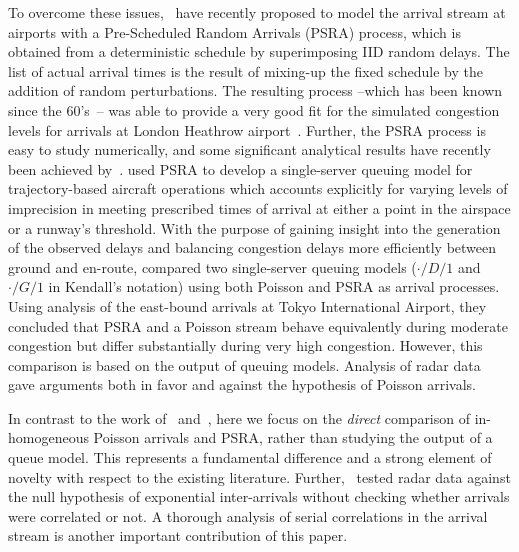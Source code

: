 \documentclass[draft,review]{elsarticle}
\begin{document}
To overcome these issues,~\citet{guadagni2011queueing} have recently proposed to model the arrival stream at airports with a Pre-Scheduled Random Arrivals (\ac{PSRA}) process, which is obtained from a deterministic schedule by superimposing \ac{IID} random delays.
The list of actual arrival times is the result of mixing-up the fixed schedule by the addition of random perturbations.
The resulting process --which has been known since the 60's~\citep{Kendall1964}-- was able to provide a very good fit for the simulated congestion levels for arrivals at London Heathrow airport~\citep{caccavale2014model}.
Further, the \ac{PSRA} process is easy to study numerically, and some significant analytical results have recently been achieved by~\citet{lancia2013advances}.
\citet{nikoleris2012queueing} used \ac{PSRA} to develop a single-server queuing model for trajectory-based aircraft operations which accounts explicitly for varying levels of imprecision in meeting prescribed times of arrival at either a point in the airspace or a runway's threshold.
With the purpose of gaining insight into the generation of the observed delays and balancing congestion delays more efficiently between ground and en-route, \citet{gwiggner2014data} compared two single-server queuing models (\(\cdot/D/1\) and \(\cdot/G/1\) in Kendall's notation) using both Poisson and \ac{PSRA} as arrival processes.
Using analysis of the east-bound arrivals at Tokyo International Airport, they concluded that \ac{PSRA} and a Poisson stream behave equivalently during moderate congestion but differ substantially during very high congestion.
However, this comparison is based on the output of queuing models.
Analysis of radar data gave arguments both in favor and against the hypothesis of Poisson arrivals.

In contrast to the work of~\citep{caccavale2014model} and~\citet{gwiggner2014data}, here we focus on the \emph{direct} comparison of in-homogeneous Poisson arrivals and \ac{PSRA}, rather than studying  the output of a queue model.
This represents a fundamental difference and a strong element of novelty with respect to the existing literature.
Further,~\citet{gwiggner2014data} tested radar data against the null hypothesis of exponential inter-arrivals without checking whether arrivals were correlated or not.
A thorough analysis of serial correlations in the arrival stream is another important contribution of this paper.
\end{document}
